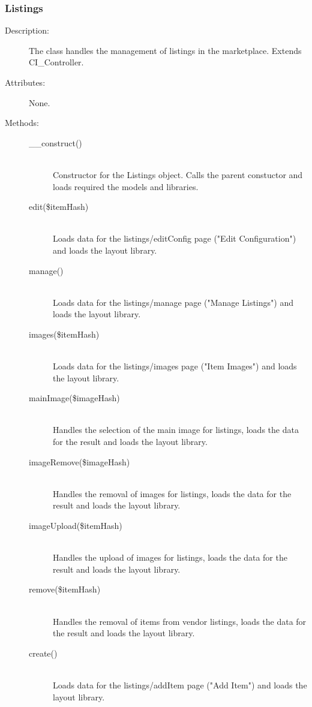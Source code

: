 \documentclass[11pt]{article} %
\begin{document}
\subsubsection{Listings}
\begin{description}
\item[Description:] The class handles the management of listings in the marketplace. Extends CI\_Controller.
\item[Attributes:] None.
\item[Methods:] \textbf{ }
\begin{description}
\item[\_\_construct()]  \textbf{ }\\
Constructor for the Listings object. Calls the parent constuctor and loads required the models and libraries.
\item[edit(\$itemHash)]  \textbf{ }\\
Loads data for the listings/editConfig page ("Edit Configuration") and loads the layout library.
\item[manage()]  \textbf{ }\\
Loads data for the listings/manage page ("Manage Listings") and loads the layout library.
\item[images(\$itemHash)]  \textbf{ }\\
Loads data for the listings/images page ("Item Images") and loads the layout library.
\item[mainImage(\$imageHash)]  \textbf{ }\\
Handles the selection of the main image for listings, loads the data for the result and loads the layout library.
\item[imageRemove(\$imageHash)]  \textbf{ }\\
Handles the removal of images for listings, loads the data for the result and loads the layout library.
\item[imageUpload(\$itemHash)]  \textbf{ }\\
Handles the upload of images for listings, loads the data for the result and loads the layout library.
\item[remove(\$itemHash)]  \textbf{ }\\
Handles the removal of items from vendor listings, loads the data for the result and loads the layout library.
\item[create()]  \textbf{ }\\
Loads data for the listings/addItem page ("Add Item") and loads the layout library.
\end{description} 
\end{description} 
\end{document}
